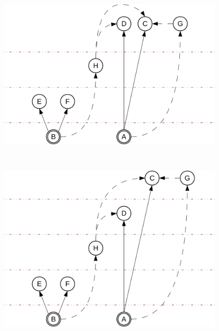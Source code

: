 \begin{figure}[tp]
\begin{minipage}[b]{0.5\linewidth}
    \centering
    \includegraphics[scale=0.4]{figures/complementation/steps-3.pdf}
    \label{hiercomp/fig:multiple:steps:3}
  \end{minipage}
  \vspace{0mm}
  \\
  \begin{minipage}[b]{0.5\linewidth}
    \centering
    \includegraphics[scale=0.4]{figures/complementation/steps-4.pdf}
    \label{hiercomp/fig:multiple:steps:4}
  \end{minipage}
  \begin{minipage}[b]{0.5\linewidth}
    \centering

\end{minipage}
\end{figure}

